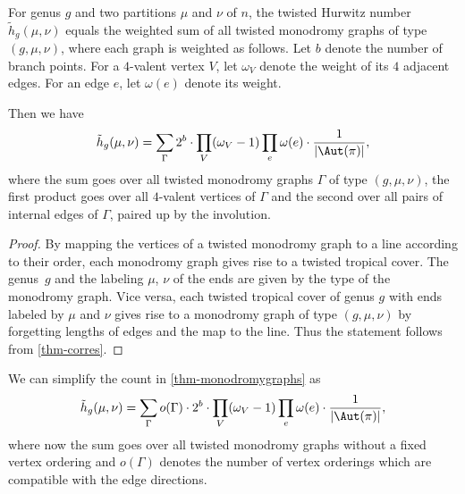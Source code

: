 \begin{coro}\label{thm-monodromygraphs}
For genus $g$ and two partitions $\mu$ and $\nu$ of $n$, the twisted Hurwitz number $\tilde{h}_g(\mu,\nu)$ equals the weighted sum of all twisted monodromy graphs of type $(g,\mu,\nu)$, where each graph is weighted as follows. Let $b$ denote the number of branch points.
For a $4$-valent vertex $V$, let $\omega_V$ denote the weight of its $4$ adjacent edges. For an edge $e$, let $\omega(e)$ denote its weight. 

Then we have
$$\tilde{h}_g(\mu,\nu)=\sum_{\Gamma} 2^{b}\cdot \prod_V (\omega_V-1)\prod_e\omega(e)\cdot \frac{1}{|\Aut(\pi)|},$$
where the sum goes over all twisted monodromy graphs $\Gamma$ of type $(g,\mu,\nu)$, the first product goes over all $4$-valent vertices of $\Gamma$ and the second over all pairs of internal edges of $\Gamma$, paired up by the involution.
\end{coro}

\begin{proof}
By mapping the vertices of a twisted monodromy graph to a line according to their order, each monodromy graph gives rise to a twisted tropical cover. The genus~$g$ and the labeling $\mu$, $\nu$ of the ends are given by the type of the monodromy graph. Vice versa, each twisted tropical cover of genus $g$ with ends labeled by $\mu$ and $\nu$ gives rise to a monodromy graph of type $(g,\mu,\nu)$ by forgetting lengths of edges and the map to the line. Thus the statement follows from \cref{thm-corres}. 
\end{proof}

\begin{coro}\label{cor-monodromygraphs}
We can simplify the count in \cref{thm-monodromygraphs} as
$$\tilde{h}_g(\mu,\nu)=\sum_{\Gamma} o(\Gamma) \cdot 2^{b}\cdot \prod_V (\omega_V-1)\prod_e\omega(e)\cdot \frac{1}{|\Aut(\pi)|},$$
where now the sum goes over all twisted monodromy graphs without a fixed vertex ordering and $o(\Gamma)$ denotes the number of vertex orderings which are compatible with the edge directions.
\end{coro}

